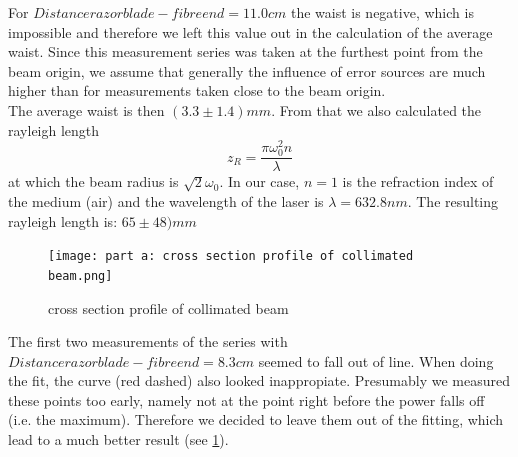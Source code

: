 \documentclass{article}
\begin{document}
 For $Distance razor blade - fibre end = 11.0 cm$ the waist is negative, which is impossible and therefore we left this value out in the calculation of the average waist. Since this measurement series was taken at the furthest point from the beam origin, we assume that generally the influence of error sources are much higher than for measurements taken close to the beam origin.\\

 The average waist is then $(3.3\pm 1.4) mm$. From that we also calculated the rayleigh length 
\begin{equation}
z_{R} = \frac{\pi\omega_{0}^2 n}{\lambda} 
\label{rayleighlength}
\end{equation}
at which the beam radius is $\sqrt{2}\omega_{0}$. In our case, $n=1$ is the refraction index of the medium (air) and the wavelength of the laser is $\lambda =632.8 nm$. The resulting rayleigh length is:
$65 \pm 48) mm$\\

\begin{figure}
\texttt{[image: part a: cross section profile of collimated beam.png]}
\caption{cross section profile of collimated beam}
\label{part_a_fig} %
\end{figure}

The first two measurements of the series with $Distance razor blade - fibre end = 8.3 cm$ seemed to fall out of line. When doing the fit, the curve (red dashed) also looked inappropiate. Presumably we measured these points too early, namely not at the point right before the power falls off (i.e. the maximum). Therefore we decided to leave them out of the fitting, which lead to a much better result (see \ref{part_a_fig}).
\end{document}
